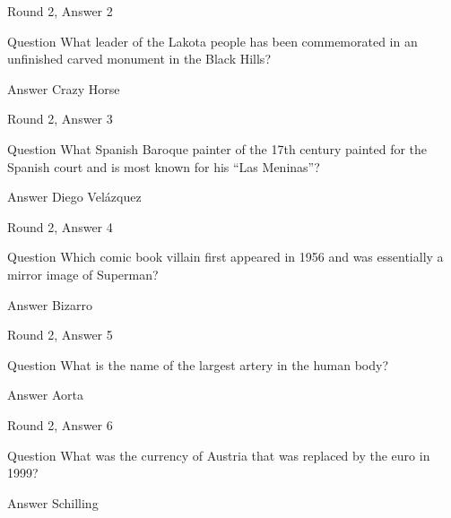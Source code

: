 \documentclass[11pt]{beamer}
\begin{document}
\begin{frame}[t]{Round 2, Answer 2}
\vspace{2em}
\begin{block}{Question}
What leader of the Lakota people has been commemorated in an unfinished carved monument in the Black Hills\@?
\end{block}
\pause{}
\begin{block}{Answer}
Crazy Horse
\end{block}
\end{frame}
    

\begin{frame}[t]{Round 2, Answer 3}
\vspace{2em}
\begin{block}{Question}
What Spanish Baroque painter of the 17th century painted for the Spanish court and is most known for his ``Las Meninas''\@?
\end{block}
\pause{}
\begin{block}{Answer}
Diego Velázquez
\end{block}
\end{frame}
    

\begin{frame}[t]{Round 2, Answer 4}
\vspace{2em}
\begin{block}{Question}
Which comic book villain first appeared in 1956 and was essentially a mirror image of Superman\@?
\end{block}
\pause{}
\begin{block}{Answer}
Bizarro
\end{block}
\end{frame}
    

\begin{frame}[t]{Round 2, Answer 5}
\vspace{2em}
\begin{block}{Question}
What is the name of the largest artery in the human body\@?
\end{block}
\pause{}
\begin{block}{Answer}
Aorta
\end{block}
\end{frame}
    

\begin{frame}[t]{Round 2, Answer 6}
\vspace{2em}
\begin{block}{Question}
What was the currency of Austria that was replaced by the euro in 1999\@?
\end{block}
\pause{}
\begin{block}{Answer}
Schilling
\end{block}
\end{frame}
    
\end{document}

